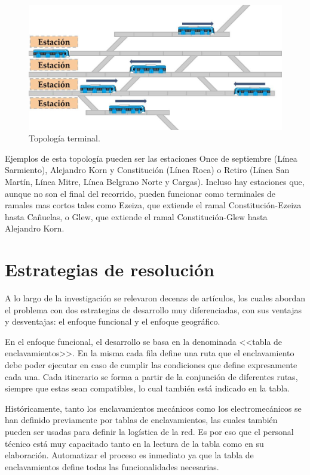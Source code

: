			\begin{figure}[h]
			\centering
				\includegraphics[scale=.4]{./Figures/Terminal}
				\caption{Topología terminal.}
				\label{fig:Terminal}
			\end{figure}
		
		Ejemplos de esta topología pueden ser las estaciones Once de septiembre (Línea Sarmiento), Alejandro Korn y Constitución (Línea Roca) o Retiro (Línea San Martín, Línea Mitre, Línea Belgrano Norte y Cargas). Incluso hay estaciones que, aunque no son el final del recorrido, pueden funcionar como terminales de ramales mas cortos tales como Ezeiza, que extiende el ramal Constitución-Ezeiza hasta Cañuelas, o Glew, que extiende el ramal Constitución-Glew hasta Alejandro Korn.
		

\section{Estrategias de resolución}

	A lo largo de la investigación se relevaron decenas de artículos, los cuales abordan el problema con dos estrategias de desarrollo muy diferenciadas, con sus ventajas y desventajas: el enfoque funcional y el enfoque geográfico.
	
	En el enfoque funcional, el desarrollo se basa en la denominada <<tabla de enclavamientos>>. En la misma cada fila define una ruta que el enclavamiento debe poder ejecutar en caso de cumplir las condiciones que define expresamente cada una. Cada itinerario se forma a partir de la conjunción de diferentes rutas, siempre que estas sean compatibles, lo cual también está indicado en la tabla.
	
	Históricamente, tanto los enclavamientos mecánicos como los electromecánicos se han definido previamente por tablas de enclavamientos, las cuales también pueden ser usadas para definir la logística de la red. Es por eso que el personal técnico está muy capacitado tanto en la lectura de la tabla como en su elaboración. Automatizar el proceso es inmediato ya que la tabla de enclavamientos define todas las funcionalidades necesarias.
	
